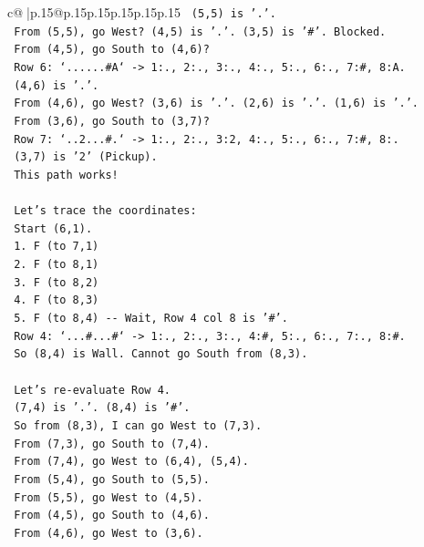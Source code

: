 \documentclass{article}
\begin{document}
{\begin{supertabular}{c@{$\;$}|p{.15\linewidth}@{}p{.15\linewidth}p{.15\linewidth}p{.15\linewidth}p{.15\linewidth}p{.15\linewidth}}
{{{\texttt{       (5,5) is '.'.} \\
\texttt{       From (5,5), go West? (4,5) is '.'. (3,5) is '\#'. Blocked.} \\
\texttt{       From (4,5), go South to (4,6)?} \\
\texttt{       Row 6: `......\#A` {-}> 1:., 2:., 3:., 4:., 5:., 6:., 7:\#, 8:A.} \\
\texttt{       (4,6) is '.'.} \\
\texttt{       From (4,6), go West? (3,6) is '.'. (2,6) is '.'. (1,6) is '.'.} \\
\texttt{       From (3,6), go South to (3,7)?} \\
\texttt{       Row 7: `..2...\#.` {-}> 1:., 2:., 3:2, 4:., 5:., 6:., 7:\#, 8:.} \\
\texttt{       (3,7) is '2' (Pickup).} \\
\texttt{       This path works!} \\
\\ 
\texttt{       Let's trace the coordinates:} \\
\texttt{       Start (6,1).} \\
\texttt{       1. F (to 7,1)} \\
\texttt{       2. F (to 8,1)} \\
\texttt{       3. F (to 8,2)} \\
\texttt{       4. F (to 8,3)} \\
\texttt{       5. F (to 8,4) {-}{-} Wait, Row 4 col 8 is '\#'.} \\
\texttt{          Row 4: `...\#...\#` {-}> 1:., 2:., 3:., 4:\#, 5:., 6:., 7:., 8:\#.} \\
\texttt{          So (8,4) is Wall. Cannot go South from (8,3).} \\
\\ 
\texttt{       Let's re{-}evaluate Row 4.} \\
\texttt{       (7,4) is '.'. (8,4) is '\#'.} \\
\texttt{       So from (8,3), I can go West to (7,3).} \\
\texttt{       From (7,3), go South to (7,4).} \\
\texttt{       From (7,4), go West to (6,4), (5,4).} \\
\texttt{       From (5,4), go South to (5,5).} \\
\texttt{       From (5,5), go West to (4,5).} \\
\texttt{       From (4,5), go South to (4,6).} \\
\texttt{       From (4,6), go West to (3,6).} \\
}}}
\end{supertabular}}
\end{document}
